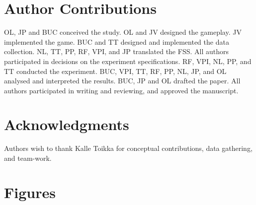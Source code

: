 \documentclass{frontierstyle/frontiersSCNS}
\begin{document}
\section*{Author Contributions}
OL, JP and BUC conceived the study.
OL and JV designed the gameplay.
JV implemented the game.
BUC and TT designed and implemented the data collection.
NL, TT, PP, RF, VPI, and JP translated the FSS.
All authors participated in decisions on the experiment specifications.
RF, VPI, NL, PP, and TT conducted the experiment.
BUC, VPI, TT, RF, PP, NL, JP, and OL analysed and interpreted the results.
BUC, JP and OL drafted the paper.
All authors participated in writing and reviewing, and approved the manuscript.


\section*{Acknowledgments}
Authors wish to thank Kalle Toikka for conceptual contributions, data gathering, and team-work.




\section*{Figures}
\end{document}
